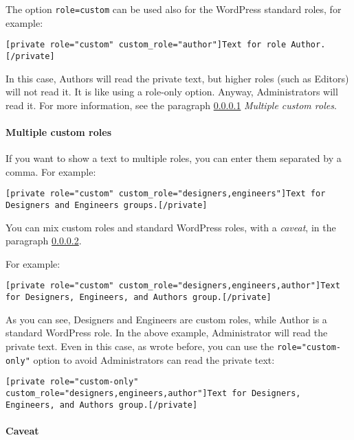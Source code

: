 \documentclass[
	titlepage,
	headinclude,
	abstract=on,
	paper=a4,
	fontsize=11pt,
]{scrartcl}
\begin{document}
The option \verb+role=custom+ can be used also for the WordPress standard roles, for example:

\begin{lstlisting}
[private role="custom" custom_role="author"]Text for role Author.[/private]
\end{lstlisting}

In this case, Authors will read the private text, but higher roles (such as Editors) will not read it. It is like using a role-only option. Anyway, Administrators will read it. For more information, see the paragraph \ref{multiple-custom-roles} \textit{Multiple custom roles}.

\paragraph{Multiple custom roles}\label{multiple-custom-roles}

If you want to show a text to multiple roles, you can enter them separated by a comma. For example:

\begin{lstlisting}
[private role="custom" custom_role="designers,engineers"]Text for Designers and Engineers groups.[/private]
\end{lstlisting}

You can mix custom roles and standard WordPress roles, with a \textit{caveat}, in the paragraph \ref{caveat}.

For example:

\begin{lstlisting}
[private role="custom" custom_role="designers,engineers,author"]Text for Designers, Engineers, and Authors group.[/private]
\end{lstlisting}

As you can see, Designers and Engineers are custom roles, while Author is a standard WordPress role. In the above example, Administrator will read the private text. Even in this case, as wrote before, you can use the \verb+role="custom-only"+ option to avoid Administrators can read the private text:

\begin{lstlisting}
[private role="custom-only" custom_role="designers,engineers,author"]Text for Designers, Engineers, and Authors group.[/private]
\end{lstlisting}

\paragraph{Caveat} \label{caveat}
\end{document}
